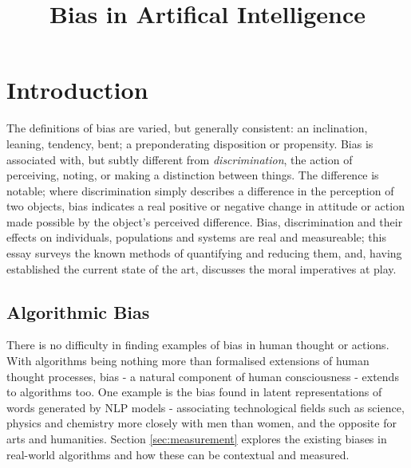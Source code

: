 \documentclass[conference]{IEEEtran}
\begin{document}
\title{Bias in Artifical Intelligence}
\author{
}
\maketitle
\section{Introduction}
The definitions of bias are varied, but generally consistent: an inclination, leaning, tendency, bent; a preponderating disposition or propensity\cite{Bias}. Bias is associated with, but subtly different from \emph{discrimination}, the action of perceiving, noting, or making a distinction between things\cite{Discrimination}. The difference is notable; where discrimination simply describes a difference in the perception of two objects, bias indicates a real positive or negative change in attitude or action made possible by the object's perceived difference. Bias, discrimination and their effects on individuals, populations and systems are real and measureable; this essay surveys the known methods of quantifying and reducing them, and, having established the current state of the art, discusses the moral imperatives at play.
\subsection{Algorithmic Bias}
There is no difficulty in finding examples of bias in human thought\cite{FitzGerald2019} or actions\cite{NBERw22014}. With algorithms being nothing more than formalised extensions of human thought processes, bias - a natural component of human consciousness - extends to algorithms too. One example is the bias found in latent representations of words generated by NLP models\cite{pmlr-v97-brunet19a} - associating technological fields such as science, physics and chemistry more closely with men than women, and the opposite for arts and humanities. Section \ref{sec:measurement} explores the existing biases in real-world algorithms and how these can be contextual and measured.
\end{document}
